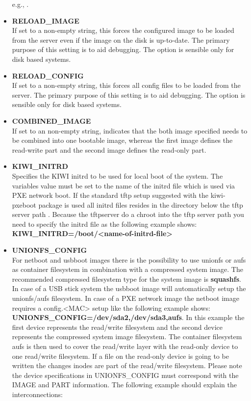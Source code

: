 \begin{itemize}
        e.g., .
    \item \textbf{RELOAD\_IMAGE}\\
        If set to a non-empty string, this forces the configured
        image to be loaded from the server even if the image on
        the disk is up-to-date. The primary purpose of this setting
        is to aid debugging. The option is sensible only for disk based
        systems.
    \item \textbf{RELOAD\_CONFIG}\\
        If set to a non-empty string, this forces all config files
        to be loaded from the server. The primary purpose of this setting
        is to aid debugging. The option is sensible only for disk based
        systems.
    \item \textbf{COMBINED\_IMAGE}\\
        If set to an non-empty string, indicates that the both
        image specified needs to be combined into one bootable
        image, whereas the first image defines the read-write
        part and the second image defines the read-only part.
    \item \textbf{KIWI\_INITRD}\\
        Specifies the KIWI initrd to be used for local boot of the
        system. The variables value must be set to the name of the
        initrd file which is used via PXE network boot. If the
        standard tftp setup suggested with the kiwi-pxeboot package
        is used all initrd files resides in the  directory
        below the tftp server path . Because
        the tftpserver do a chroot into the tftp server path you need
        to specify the initrd file as the following example shows:
        \textbf{KIWI\_INITRD=/boot/<name-of-initrd-file>}
    \item \textbf{UNIONFS\_CONFIG}\\
        For netboot and usbboot images there is the possibility to
        use unionfs or aufs as container filesystem in combination
        with a compressed system image. The recommended compressed
        filesystem type for the system image is \textbf{squashfs}.
        In case of a USB stick system the usbboot image will
        automatically setup the unionfs/aufs filesystem. In case of
        a PXE network image the netboot image requires a config.<MAC>
        setup like the following example shows:
        \textbf{UNIONFS\_CONFIG=/dev/sda2,/dev/sda3,aufs}. In this
        example the first device  represents the read/write
        filesystem and the second device  represents the
        compressed system image filesystem. The container filesystem
        aufs is then used to cover the read/write layer with the
        read-only device to one read/write filesystem. If a file on
        the read-only device is going to be written the changes inodes
        are part of the read/write filesystem. Please note the device
        specifications in UNIONFS\_CONFIG must correspond with
        the IMAGE and PART information. The following example should
        explain the interconnections:


\end{itemize}
